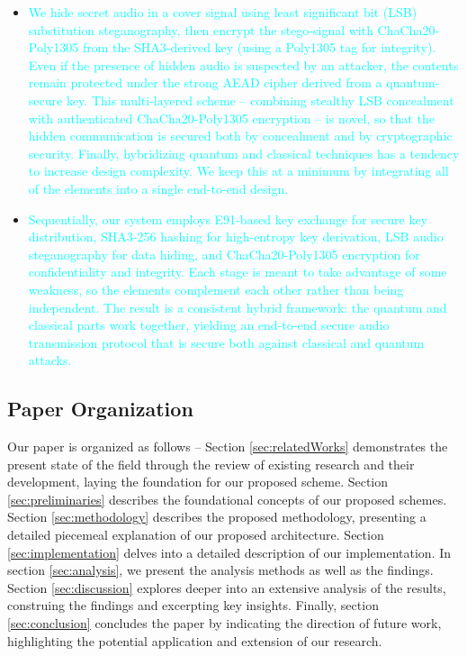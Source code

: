 \documentclass[a4paper]{cas-sc}
\begin{document}
\begin{itemize}
    \item \textcolor{cyan}{We hide secret audio in a cover signal using least significant bit (LSB) substitution steganography, then encrypt the stego-signal with ChaCha20-Poly1305 from the SHA3-derived key (using a Poly1305 tag for integrity). Even if the presence of hidden audio is suspected by an attacker, the contents remain protected under the strong AEAD cipher derived from a quantum-secure key. This multi-layered scheme -- combining stealthy LSB concealment with authenticated ChaCha20-Poly1305 encryption -- is novel, so that the hidden communication is secured both by concealment and by cryptographic security. Finally, hybridizing quantum and classical techniques has a tendency to increase design complexity. We keep this at a minimum by integrating all of the elements into a single end-to-end design.}

    \item \textcolor{cyan}{Sequentially, our system employs E91-based key exchange for secure key distribution, SHA3-256 hashing for high-entropy key derivation, LSB audio steganography for data hiding, and ChaCha20-Poly1305 encryption for confidentiality and integrity. Each stage is meant to take advantage of some weakness, so the elements complement each other rather than being independent. The result is a consistent hybrid framework: the quantum and classical parts work together, yielding an end-to-end secure audio transmission protocol that is secure both against classical and quantum attacks.}
\end{itemize}
\subsection{Paper Organization}
Our paper is organized as follows -- Section \ref{sec:relatedWorks} demonstrates the present state of the field through the review of existing research and their development, laying the foundation for our proposed scheme. Section \ref{sec:preliminaries} describes the foundational concepts of our proposed schemes. Section \ref{sec:methodology} describes the proposed methodology, presenting a detailed piecemeal explanation of our proposed architecture. Section \ref{sec:implementation} delves into a detailed description of our implementation. In section \ref{sec:analysis}, we present the analysis methods as well as the findings. Section \ref{sec:discussion} explores deeper into an extensive analysis of the results, construing the findings and excerpting key insights. Finally, section \ref{sec:conclusion} concludes the paper by indicating the direction of future work, highlighting the potential application and extension of our research.
\end{document}
